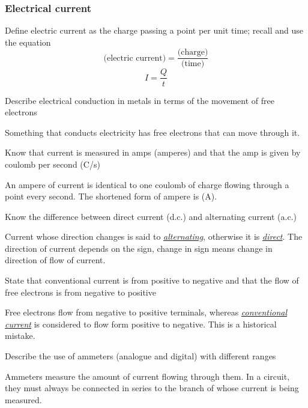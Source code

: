 \subsubsection{Electrical current}

\begin{subpoint}
Define electric current as the charge passing a point per unit time; recall and use the equation
$$ \textrm{(electric current)} = \frac{\textrm{(charge)}}{\textrm{(time)}} $$
$$ I = \frac{Q}{t} $$
\end{subpoint}

\begin{subpoint}
Describe electrical conduction in metals in terms of the movement of free electrons
\end{subpoint}

Something that conducts electricity has free electrons that can move through it.

\begin{subpoint}
Know that current is measured in amps (amperes) and that the amp is given by coulomb per second (C/s)
\end{subpoint}

An ampere of current is identical to one coulomb of charge flowing through a point every second.
The shortened form of ampere is (A).

\begin{subpoint}
Know the difference between direct current (d.c.) and alternating current (a.c.)
\end{subpoint}

Current whose direction changes is said to \ul{\emph{alternating}}, otherwise it is \ul{\emph{direct}}.
The direction of current depends on the sign, change in sign means change in direction of flow
of current.

\begin{subpoint}
State that conventional current is from positive to negative and that the flow of free electrons is from 
negative to positive
\end{subpoint}

Free electrons flow from negative to positive terminals, whereas \emph{\ul{conventional current}} is considered
to flow form positive to negative. This is a historical mistake.

\begin{subpoint}
Describe the use of ammeters (analogue and digital) with different ranges
\end{subpoint}

Ammeters measure the amount of current flowing through them. In a circuit, they must always be
connected in series to the branch of whose current is being measured. 

